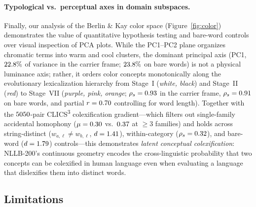 \paragraph{Typological vs.\ perceptual axes in domain subspaces.}
Finally, our analysis of the Berlin \& Kay color space (Figure~\ref{fig:color}) demonstrates the value of quantitative hypothesis testing and bare-word controls over visual inspection of PCA plots.
While the PC1--PC2 plane organizes chromatic terms into warm and cool clusters, the dominant principal axis (PC1, $22.8{}\%$ of variance in the carrier frame; $23.8{}\%$ on bare words) is not a physical luminance axis; rather, it orders color concepts monotonically along the \citet{berlin1969} evolutionary lexicalization hierarchy from Stage~I (\emph{white, black}) and Stage~II (\emph{red}) to Stage~VII (\emph{purple, pink, orange}; $\rho_s = 0.93{}$ in the carrier frame, $\rho_s = 0.91{}$ on bare words, and partial $r = 0.70{}$ controlling for word length).
Together with the $5050{}$-pair CLICS\textsuperscript{3} colexification gradient—which filters out single-family accidental homophony ($\mu = 0.30{}$ vs.\ $0.37{}$ at $\ge 3$ families) and holds across string-distinct ($w_{a,\ell} \neq w_{b,\ell}$, $d = 1.41{}$), within-category ($\rho_s = 0.32{}$), and bare-word ($d = 1.79{}$) controls—this demonstrates \emph{latent conceptual colexification}: NLLB-200's continuous geometry encodes the cross-linguistic probability that two concepts can be colexified in human language even when evaluating a language that dislexifies them into distinct words.

\subsection{Limitations}
\label{sec:limitations}


